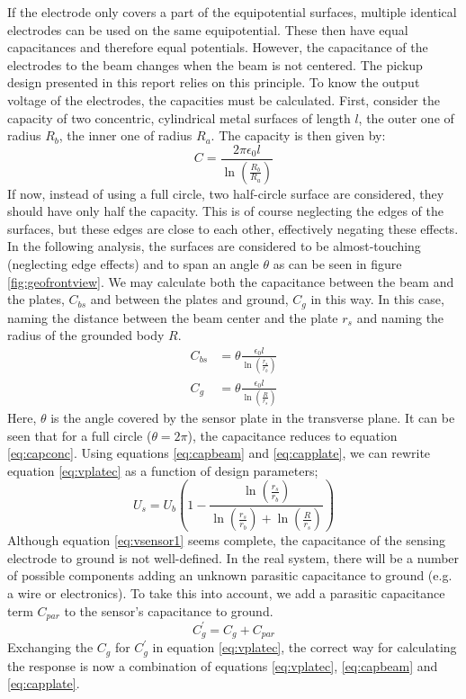 If the electrode only covers a part of the equipotential surfaces, multiple identical electrodes can be used on the same equipotential. These then have equal capacitances and therefore equal potentials.
However, the capacitance of the electrodes to the beam changes when the beam is not centered. The pickup design presented in this report relies on this principle.
To know the output voltage of the electrodes, the capacities must be calculated.
First, consider the capacity of two concentric, cylindrical metal surfaces of length $l$, the outer one of radius $R_b$, the inner one of radius $R_a$. The capacity is then given by\cite{GriffithsEM}:
\begin{equation}
C = \frac{2\pi\epsilon_0l}{\ln \left(\frac{R_b}{R_a} \right)}
\label{eq:capconc}
\end{equation}
If now, instead of using a full circle, two half-circle surface are considered, they should have only half the capacity. This is of course neglecting the edges of the surfaces, but these edges are close to each other, effectively negating these effects. In the following analysis, the surfaces are considered to be almost-touching (neglecting edge effects) and to span an angle $\theta$ as can be seen in figure \ref{fig:geofrontview}.
We may calculate both the capacitance between the beam and the plates, $C_{bs}$ and between the plates and ground, $C_g$ in this way. In this case, naming the distance between the beam center and the plate $r_s$ and naming the radius of the grounded body $R$.
\begin{align}
C_{bs} &= \theta \frac{\epsilon_0l}{\ln\left(\frac{r_s}{r_b}\right)} \label{eq:capbeam}\\
C_g &= \theta \frac{\epsilon_0l}{\ln\left(\frac{R}{r_s}\right)}
\label{eq:capplate}
\end{align}
Here, $\theta$ is the angle covered by the sensor plate in the transverse plane. It can be seen that for a full circle ($\theta=2\pi$), the capacitance reduces to equation \ref{eq:capconc}.
Using equations \ref{eq:capbeam} and \ref{eq:capplate}, we can rewrite equation \ref{eq:vplatec} as a function of design parameters;
\begin{equation}
U_s = U_b \left(1-\frac{\ln\left(\frac{r_s}{r_b}\right)}{\ln\left(\frac{r_s}{r_b}\right)+\ln\left(\frac{R}{r_s}\right)} \right)
\label{eq:vsensor1}
\end{equation}
Although equation \ref{eq:vsensor1} seems complete, the capacitance of the sensing electrode to ground is not well-defined.  In the real system, there will be a number of possible components adding an unknown parasitic capacitance to ground (e.g. a wire or electronics). To take this into account, we add a parasitic capacitance term $C_{par}$ to the sensor's capacitance to ground.
\begin{equation*}
C_g^\prime = C_g + C_{par} 
\end{equation*}
Exchanging the $C_g$ for $C_g^\prime$ in equation \ref{eq:vplatec}, the correct way for calculating the response is now a combination of equations \ref{eq:vplatec}, \ref{eq:capbeam} and \ref{eq:capplate}.

